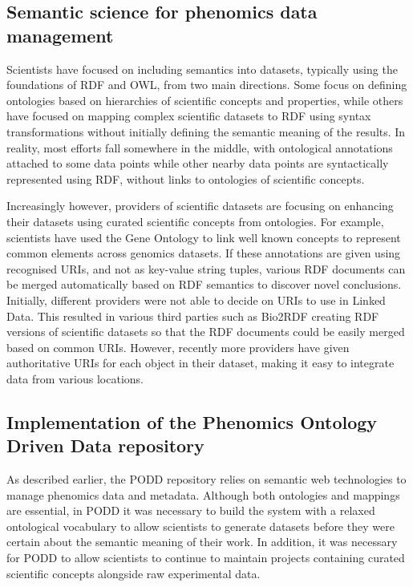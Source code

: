 \documentclass{llncs}
\begin{document}
\subsection{Semantic science for phenomics data management}
Scientists have focused on including semantics into datasets, typically using
the foundations of RDF and OWL, from two main directions. Some focus on defining
ontologies based on hierarchies of scientific concepts and properties, while
others have focused on mapping complex scientific datasets to RDF using syntax
transformations without initially defining the semantic meaning of the results.
In reality, most efforts fall somewhere in the middle, with ontological
annotations attached to some data points while other nearby data points are
syntactically represented using RDF, without links to ontologies of scientific
concepts.


Increasingly however, providers of scientific datasets are focusing on enhancing
their datasets using curated scientific concepts from ontologies. For example,
scientists have used the Gene Ontology \cite{Ashburner2000} to link well known concepts to
represent common elements across genomics datasets. If these annotations are
given using recognised URIs, and not as key-value string tuples, various RDF
documents can be merged automatically based on RDF semantics to discover novel
conclusions. Initially, different providers were not able to decide on URIs to
use in Linked Data. This resulted in various third parties such as Bio2RDF
\cite{Belleau2008}
creating RDF versions of scientific datasets so that the RDF documents could be
easily merged based on common URIs. However, recently more providers have given
authoritative URIs for each object in their dataset, making it easy to integrate
data from various locations.


\subsection{Implementation of the Phenomics Ontology Driven Data repository}
As described earlier, the PODD repository relies on semantic web technologies to
manage phenomics data and metadata. Although both ontologies and mappings are
essential, in PODD it was necessary to build the system with a relaxed
ontological vocabulary to allow scientists to generate datasets before they were
certain about the semantic meaning of their work. In addition, it was necessary
for PODD to allow scientists to continue to maintain projects containing curated
scientific concepts alongside raw experimental data. 
\end{document}

